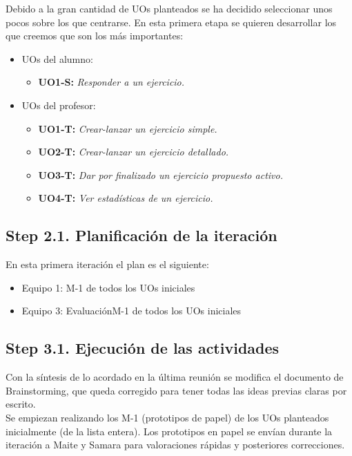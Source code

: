 Debido a la gran cantidad de UOs planteados se ha decidido seleccionar unos pocos sobre los que centrarse. En esta primera etapa se quieren desarrollar los que creemos que son los más importantes:

\begin{itemize}
\item UOs del alumno:
	\begin{itemize}
	\item \textbf{UO1-S:} \textit{Responder a un ejercicio.}
	\end{itemize}
\item UOs del profesor:
	\begin{itemize}
	\item \textbf{UO1-T:} \textit{Crear-lanzar un ejercicio simple.}
	\item \textbf{UO2-T:} \textit{Crear-lanzar un ejercicio detallado.}
	\item \textbf{UO3-T:} \textit{Dar por finalizado un ejercicio propuesto activo.}
	\item \textbf{UO4-T:} \textit{Ver estadísticas de un ejercicio.}
	\end{itemize}
\end{itemize}

\subsection{Step 2.1. Planificación de la iteración}
\label{it1:2.1}

En esta primera iteración el plan es el siguiente:

\begin{itemize}
\item Equipo 1: M-1 de todos los UOs iniciales
\item Equipo 3: Evaluación{M-1 de todos los UOs iniciales}
\end{itemize}

\subsection{Step 3.1. Ejecución de las actividades}
\label{it1:3.1}

Con la síntesis de lo acordado en la última reunión se modifica el documento de Brainstorming, que queda corregido para tener todas las ideas previas claras por escrito.\\

Se empiezan realizando los M-1 (prototipos de papel) de los UOs planteados inicialmente (de la lista entera). Los prototipos en papel se envían durante la iteración a Maite y Samara para valoraciones rápidas y posteriores correcciones.\\

